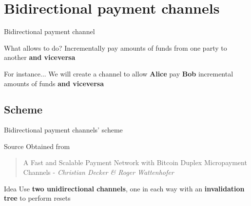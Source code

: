 \documentclass{beamer}
\begin{document}
\section{Bidirectional payment channels}
\begin{frame}{Bidirectional payment channel}
 \begin{block}{What allows to do?}
  Incrementally pay amounts of funds from one party to another \textbf{and viceversa}
 \end{block}
 \pause
 \begin{exampleblock}{For instance...}
  We will create a channel to allow \textbf{Alice} pay \textbf{Bob} incremental amounts of funds \textbf{and viceversa}
 \end{exampleblock}
\end{frame}
\subsection{Scheme}
\begin{frame}{Bidirectional payment channels' scheme}
 \begin{block}{Source}
  Obtained from
  \begin{quote}
   A Fast and Scalable Payment Network with Bitcoin Duplex Micropayment Channels - \textit{Christian Decker \& Roger Wattenhofer}
  \end{quote}
 \end{block}
 \pause
 \begin{block}{Idea}
  Use \textbf{two unidirectional channels}, one in each way with an \textbf{invalidation tree} to perform resets
 \end{block}
\end{frame}
\end{document}
